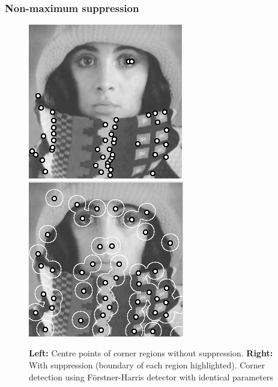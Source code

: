 \documentclass{beamer}
\begin{document}
    \begin{frame}[t]
        \frametitle{Non-maximum suppression}
        \begin{figure}
            \centering
            \includegraphics[width=0.4\linewidth]{../thesis/Images/trui_corners_non_cnms.png}
            \includegraphics[width=0.4\linewidth]{../thesis/Images/trui_corners_cnms_influence.png}
            \caption{\textbf{Left:} Centre points of corner regions without suppression. \textbf{Right:} With
            suppression (boundary of each region highlighted). Corner detection using
        Förstner-Harris detector with identical parameters}
        \end{figure}
    \end{frame}
\end{document}
